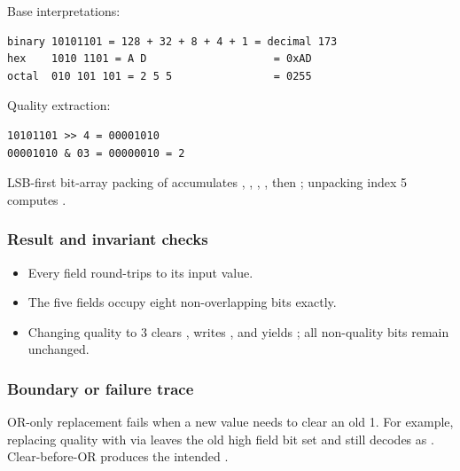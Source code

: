 Base interpretations:

\begin{verbatim}
binary 10101101 = 128 + 32 + 8 + 4 + 1 = decimal 173
hex    1010 1101 = A D                    = 0xAD
octal  010 101 101 = 2 5 5                = 0255
\end{verbatim}

Quality extraction:

\begin{verbatim}
10101101 >> 4 = 00001010
00001010 & 03 = 00000010 = 2
\end{verbatim}

LSB-first bit-array packing of \BookInlineCode{{[}1,0,1,1,0,1,0,1{]}} accumulates , , , , then ; unpacking index 5 computes .

\subsubsection{Result and invariant checks}\label{appendix-92ff77d4dfdc-result-and-invariant-checks}

\hypertarget{appendix-92ff77d4dfdc-result-and-invariant-checks}{}

\begin{itemize}
\tightlist
\item
  Every field round-trips to its input value.
\item
  The five fields occupy eight non-overlapping bits exactly.
\item
  Changing quality to 3 clears , writes , and yields ; all non-quality bits remain unchanged.
\end{itemize}

\subsubsection{Boundary or failure trace}\label{appendix-92ff77d4dfdc-boundary-or-failure-trace}

\hypertarget{appendix-92ff77d4dfdc-boundary-or-failure-trace}{}

OR-only replacement fails when a new value needs to clear an old 1. For example, replacing quality  with  via  leaves the old high field bit set and still decodes as . Clear-before-OR produces the intended .

